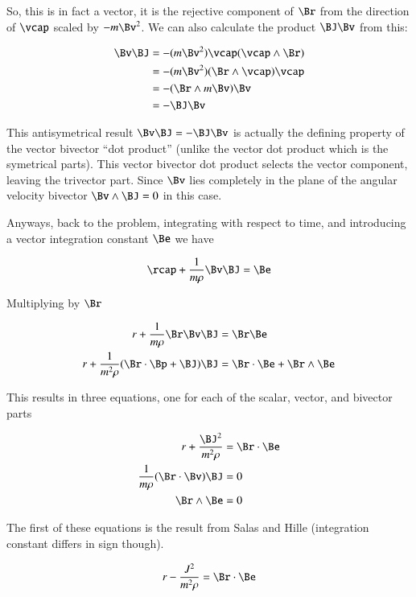 \documentclass{article}
\begin{document}
So, this is in fact a vector, it is the rejective component of $\Br$ from
the direction of $\vcap$ scaled by $-m\Bv^2$.  We can also calculate
the product $\BJ \Bv$ from this:

\begin{align*}
\Bv \BJ 
        &= - (m \Bv^2) \vcap (\vcap \wedge \Br) \\
        &= - (m \Bv^2) (\Br \wedge \vcap) \vcap \\
        &= - (\Br \wedge m \Bv) \Bv \\
        &= - \BJ \Bv \\
\end{align*}

This antisymetrical result $\Bv \BJ = - \BJ \Bv$ is actually the defining 
property of the vector bivector ``dot product'' (unlike the vector dot product
which is the symetrical parts).  This vector bivector dot product selects the
vector component, leaving the trivector part.  Since $\Bv$ lies completely in
the plane of the angular velocity bivector $\Bv \wedge \BJ = 0$ in this case.

Anyways, back to the problem, integrating 
with respect to time, and introducing a vector integration constant $\Be$
we have

\[
\rcap + \frac{1}{m \rho} \Bv \BJ = \Be
\]

Multiplying by $\Br$

\begin{align*}
r + \frac{1}{m \rho} \Br \Bv \BJ &= \Br \Be \\
r + \frac{1}{m^2 \rho} (\Br \cdot \Bp + \BJ) \BJ &= \Br \cdot \Be + \Br \wedge \Be \\
\end{align*}

This results in three equations, one for each of the scalar, vector, and bivector parts

\begin{align*}
r + \frac{\BJ^2}{m^2 \rho} &= \Br \cdot \Be \\
\frac{1}{m \rho} (\Br \cdot \Bv) \BJ &= 0 \\
\Br \wedge \Be &= 0 \\
\end{align*}

The first of these equations is the result from Salas and Hille (integration constant differs in sign though).

\begin{align*}
r - \frac{J^2}{m^2 \rho} &= \Br \cdot \Be \\
\end{align*}
\end{document}
